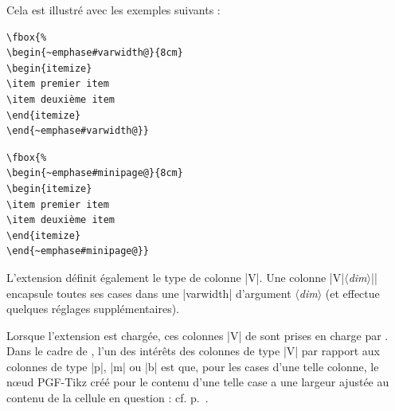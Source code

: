 \documentclass[dvipsnames]{article}%
\begin{document}
\smallskip
Cela est illustré avec les exemples suivants :

\medskip
\begin{BVerbatim}[baseline=c,boxwidth=6cm]
\fbox{%
\begin{~emphase#varwidth@}{8cm}
\begin{itemize}
\item premier item
\item deuxième item
\end{itemize}
\end{~emphase#varwidth@}}
\end{BVerbatim}

\bigskip
\begin{BVerbatim}[baseline=c,boxwidth=6cm]
\fbox{%
\begin{~emphase#minipage@}{8cm}
\begin{itemize}
\item premier item
\item deuxième item
\end{itemize}
\end{~emphase#minipage@}}
\end{BVerbatim}

\bigskip
L'extension  définit également le type de colonne |V|. Une colonne
|V{|$\langle$\textsl{dim}$\rangle$|}| encapsule toutes ses cases dans une
|{varwidth}| d'argument $\langle$\textsl{dim}$\rangle$ (et effectue quelques
réglages supplémentaires).

\medskip
Lorsque l'extension  est chargée, ces colonnes |V| de
 sont prises en charge par . Dans le cadre de
, l'un des intérêts des colonnes de type |V| par rapport aux
colonnes de type |p|, |m| ou |b| est que, pour les cases d'une telle colonne,
le nœud PGF-Tikz créé pour le contenu d'une telle case a une largeur ajustée
au contenu de la cellule en question : cf. p.~\pageref{node-V}. 
\end{document}
